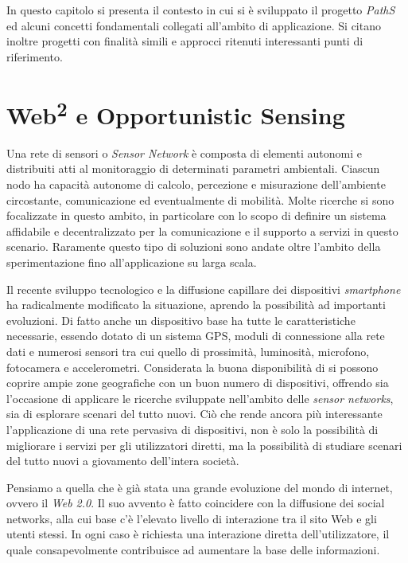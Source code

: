 In questo capitolo si presenta il contesto in cui si è sviluppato il progetto \emph{PathS} ed alcuni concetti fondamentali collegati all'ambito di applicazione. Si citano inoltre progetti con finalità simili e approcci ritenuti interessanti punti di riferimento.

\section{Web\textsuperscript{2} e Opportunistic Sensing}
Una rete di sensori o \emph{Sensor Network} è composta di elementi autonomi e distribuiti atti al monitoraggio di determinati parametri ambientali. Ciascun nodo ha capacità autonome di calcolo, percezione e misurazione dell'ambiente circostante, comunicazione ed eventualmente di mobilità. Molte ricerche si sono focalizzate in questo ambito, in particolare con lo scopo di definire un sistema affidabile e decentralizzato per la comunicazione e il supporto a servizi in questo scenario. Raramente questo tipo di soluzioni sono andate oltre l'ambito della sperimentazione fino all'applicazione su larga scala. 

Il recente sviluppo tecnologico e la diffusione capillare dei dispositivi \emph{smartphone} ha radicalmente modificato la situazione, aprendo la possibilità ad importanti evoluzioni. Di fatto anche un dispositivo base ha tutte le caratteristiche necessarie, essendo dotato di un sistema GPS, moduli di connessione alla rete dati e numerosi sensori tra cui quello di prossimità, luminosità, microfono, fotocamera e accelerometri. Considerata la buona disponibilità di si possono coprire ampie zone geografiche con un buon numero di dispositivi, offrendo sia l'occasione di applicare le ricerche sviluppate nell'ambito delle \emph{sensor networks}, sia di esplorare scenari del tutto nuovi. Ciò che rende ancora più interessante l'applicazione di una rete pervasiva di dispositivi, non è solo la possibilità di migliorare i servizi per gli utilizzatori diretti, ma la possibilità di studiare scenari del tutto nuovi a giovamento dell'intera società.

Pensiamo a quella che è già stata una grande evoluzione del mondo di internet, ovvero il \emph{Web 2.0}. Il suo avvento è fatto coincidere con la diffusione dei social networks, alla cui base c'è l'elevato livello di interazione tra il sito Web e gli utenti stessi. In ogni caso è richiesta una interazione diretta dell'utilizzatore, il quale consapevolmente contribuisce ad aumentare la base delle informazioni. 

